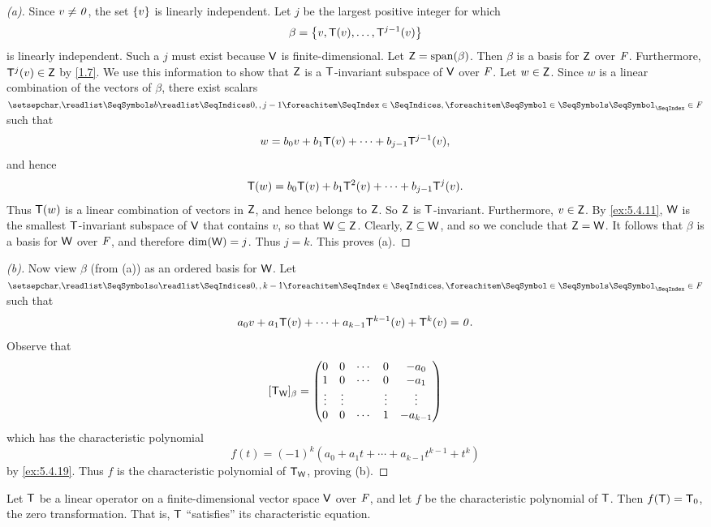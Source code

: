 \begin{proof}[(a)]
  Since \(v \neq \mathit{0}\), the set \(\left\lbrace v\right\rbrace\) is linearly independent.
  Let \(j\) be the largest positive integer for which
  \[
    \beta = \left\lbrace v, \mathsf{T}(v), \dots, \mathsf{T}^{j - 1}(v)\right\rbrace
  \]
  is linearly independent.
  Such a \(j\) must exist because \(\mathsf{V}\) is finite-dimensional.
  Let \(\vs{Z} = \spn{\beta}\).
  Then \(\beta\) is a basis for \(\mathsf{Z}\) over \(\mathit{F}\).
  Furthermore, \(\mathsf{T}^j(v) \in \mathsf{Z}\) by \cref{1.7}.
  We use this information to show that \(\mathsf{Z}\) is a \(\mathsf{T}\)-invariant subspace of \(\mathsf{V}\) over \(\mathit{F}\).
  Let \(w \in \mathsf{Z}\).
  Since \(w\) is a linear combination of the vectors of \(\beta\), there exist scalars \(\seq{b}{0,,j-1} \in \F\) such that
  \[
    w = b_0 v + b_1 \mathsf{T}(v) + \cdots + b_{j - 1} \mathsf{T}^{j - 1}(v),
  \]
  and hence
  \[
    \mathsf{T}(w) = b_0 \mathsf{T}(v) + b_1 \mathsf{T}^2(v) + \cdots + b_{j - 1} \mathsf{T}^j(v).
  \]
  Thus \(\mathsf{T}(w)\) is a linear combination of vectors in \(\mathsf{Z}\), and hence belongs to \(\mathsf{Z}\).
  So \(\mathsf{Z}\) is \(\mathsf{T}\)-invariant.
  Furthermore, \(v \in \mathsf{Z}\).
  By \cref{ex:5.4.11}, \(\mathsf{W}\) is the smallest \(\mathsf{T}\)-invariant subspace of \(\mathsf{V}\) that contains \(v\), so that \(\mathsf{W} \subseteq \mathsf{Z}\).
  Clearly, \(\mathsf{Z} \subseteq \mathsf{W}\), and so we conclude that \(\mathsf{Z} = \mathsf{W}\).
  It follows that \(\beta\) is a basis for \(\mathsf{W}\) over \(\mathit{F}\), and therefore \(\dim(\mathsf{W}) = j\).
  Thus \(j = k\).
  This proves (a).
\end{proof}

\begin{proof}[(b)]
  Now view \(\beta\) (from (a)) as an ordered basis for \(\mathsf{W}\).
  Let \(\seq{a}{0,,k-1} \in \F\) such that
  \[
    a_0 v + a_1 \mathsf{T}(v) + \cdots + a_{k - 1} \mathsf{T}^{k - 1}(v) + \mathsf{T}^k(v) = \mathit{0}.
  \]
  Observe that
  \[
    [\mathsf{T}_{\mathsf{W}}]_{\beta} = \begin{pmatrix}
      0      & 0      & \cdots & 0      & -a_0       \\
      1      & 0      & \cdots & 0      & -a_1       \\
      \vdots & \vdots &        & \vdots & \vdots     \\
      0      & 0      & \cdots & 1      & -a_{k - 1}
    \end{pmatrix}
  \]
  which has the characteristic polynomial
  \[
    f(t) = (-1)^k (a_0 + a_1 t + \cdots + a_{k - 1} t^{k - 1} + t^k)
  \]
  by \cref{ex:5.4.19}.
  Thus \(f\) is the characteristic polynomial of \(\mathsf{T}_{\mathsf{W}}\), proving (b).
\end{proof}

\begin{thm}\label{5.23}
  Let \(\mathsf{T}\) be a linear operator on a finite-dimensional vector space \(\mathsf{V}\) over \(\mathit{F}\), and let \(f\) be the characteristic polynomial of \(\mathsf{T}\).
  Then \(f(\mathsf{T}) = \mathsf{T}_0\), the zero transformation.
  That is, \(\mathsf{T}\) ``satisfies'' its characteristic equation.
\end{thm}

